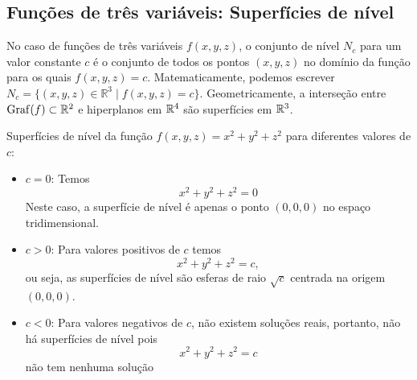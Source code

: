 \newpage


\subsection{Funções de três variáveis: Superfícies de nível}

No caso de funções de três variáveis \( f(x, y, z) \), o conjunto de nível \( N_c \) para um valor constante \( c \) é o conjunto de todos os pontos \((x, y, z)\) no domínio da função para os quais \( f(x, y, z) = c \). Matematicamente, podemos escrever \( N_c = \{(x, y, z) \in \mathbb{R}^3 \mid f(x, y, z) = c\} \).
Geometricamente, a interseção entre $\operatorname{Graf}(f)\subset\mathbb{R}^2$ e hiperplanos em $\mathbb{R}^4$ são superfícies em $\mathbb{R}^3$. 




\begin{example}{}{}
Superfícies de nível da função \(f(x, y, z) = x^2 + y^2 + z^2\) para diferentes valores de \(c\):

\begin{itemize}[label=\color{examplescolor!140}\textbullet]
\item \(c = 0\): Temos 
\[
x^2 + y^2 + z^2 = 0
\]
Neste caso, a superfície de nível é apenas o ponto \((0, 0, 0)\) no espaço tridimensional.


\item\(c > 0\): Para valores positivos de \(c\) temos
\[
x^2 + y^2 + z^2 = c,
\]
ou seja, as superfícies de nível são esferas de raio \(\sqrt{c}\) centrada na origem \((0, 0, 0)\).


\item \(c < 0\): Para valores negativos de \(c\), não existem soluções reais, portanto, não há superfícies de nível pois 
\[
x^2 + y^2 + z^2 = c
\]
não tem nenhuma solução
\end{itemize}


\end{example}


